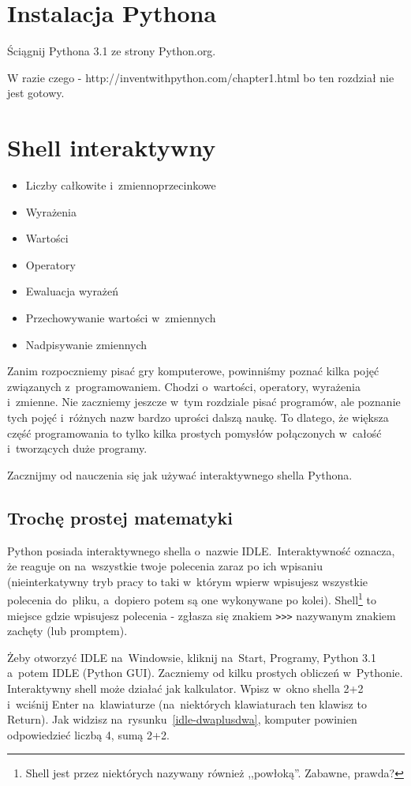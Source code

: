 \documentclass{book}
\newcommand{\btopicscovered}{
	\begin{graybox}
	\begin{itemize}
}
\newcommand{\etopicscovered}{
	\end{itemize}
	\end{graybox}
}
\begin{document}
\chapter{Instalacja Pythona}

Ściągnij Pythona 3.1 ze strony Python.org.

W razie czego - http://inventwithpython.com/chapter1.html bo ten rozdział nie jest gotowy.

\chapter{Shell interaktywny}
\btopicscovered
	\item Liczby całkowite i~zmiennoprzecinkowe
	\item Wyrażenia
	\item Wartości
	\item Operatory
	\item Ewaluacja wyrażeń
	\item Przechowywanie wartości w~zmiennych
	\item Nadpisywanie zmiennych
\etopicscovered

Zanim rozpoczniemy pisać gry komputerowe, powinniśmy poznać kilka pojęć związanych z~programowaniem. Chodzi o~wartości, operatory, wyrażenia i~zmienne. Nie zaczniemy jeszcze w~tym rozdziale pisać programów, ale poznanie tych pojęć i~różnych nazw bardzo uprości dalszą naukę. To dlatego, że większa część programowania to tylko kilka prostych pomysłów połączonych w~całość i~tworzących duże programy.

Zacznijmy od nauczenia się jak używać interaktywnego shella Pythona.

\section{Trochę prostej matematyki}

Python posiada interaktywnego shella o~nazwie IDLE.~Interaktywność oznacza, że reaguje on na~wszystkie twoje polecenia zaraz po ich wpisaniu (nieinterkatywny tryb pracy to taki w~którym wpierw wpisujesz wszystkie polecenia do~pliku, a~dopiero potem są one wykonywane po kolei). Shell\footnote{Shell jest przez niektórych nazywany również ,,powłoką''. Zabawne, prawda?} to miejsce gdzie wpisujesz polecenia - zgłasza się znakiem \lstinline{>>>} nazywanym znakiem zachęty (lub promptem).

Żeby otworzyć IDLE na~Windowsie, kliknij na~Start, Programy, Python 3.1 a~potem IDLE (Python GUI). Zaczniemy od kilku prostych obliczeń w~Pythonie. Interaktywny shell może działać jak kalkulator. Wpisz w~okno shella 2+2 i~wciśnij Enter na~klawiaturze (na~niektórych klawiaturach ten klawisz to Return). Jak widzisz na~rysunku~\ref{idle-dwaplusdwa}, komputer powinien odpowiedzieć liczbą 4, sumą 2+2.
\end{document}
